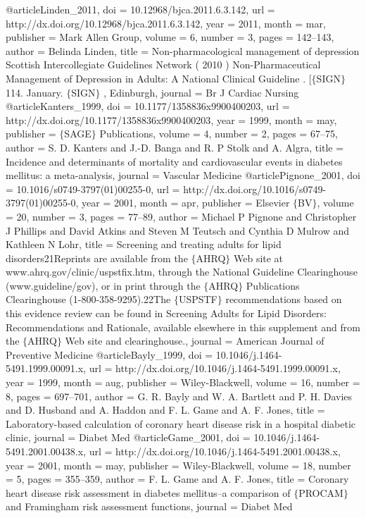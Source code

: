 @article{Linden_2011,
	doi = {10.12968/bjca.2011.6.3.142},
	url = {http://dx.doi.org/10.12968/bjca.2011.6.3.142},
	year = 2011,
	month = {mar},
	publisher = {Mark Allen Group},
	volume = {6},
	number = {3},
	pages = {142--143},
	author = {Belinda Linden},
	title = {Non-pharmacological management of depression Scottish Intercollegiate Guidelines Network ( 2010 ) Non-Pharmaceutical Management of Depression in Adults: A National Clinical Guideline . [$\lbrace$SIGN$\rbrace$ 114. January. $\lbrace$SIGN$\rbrace$ , Edinburgh},
	journal = {Br J Cardiac Nursing}
}
@article{Kanters_1999,
	doi = {10.1177/1358836x9900400203},
	url = {http://dx.doi.org/10.1177/1358836x9900400203},
	year = 1999,
	month = {may},
	publisher = {$\lbrace$SAGE$\rbrace$ Publications},
	volume = {4},
	number = {2},
	pages = {67--75},
	author = {S. D. Kanters and J.-D. Banga and R. P Stolk and A. Algra},
	title = {Incidence and determinants of mortality and cardiovascular events in diabetes mellitus: a meta-analysis},
	journal = {Vascular Medicine}
}
@article{Pignone_2001,
	doi = {10.1016/s0749-3797(01)00255-0},
	url = {http://dx.doi.org/10.1016/s0749-3797(01)00255-0},
	year = 2001,
	month = {apr},
	publisher = {Elsevier $\lbrace$BV$\rbrace$},
	volume = {20},
	number = {3},
	pages = {77--89},
	author = {Michael P Pignone and Christopher J Phillips and David Atkins and Steven M Teutsch and Cynthia D Mulrow and Kathleen N Lohr},
	title = {Screening and treating adults for lipid disorders21Reprints are available from the $\lbrace$AHRQ$\rbrace$ Web site at www.ahrq.gov/clinic/uspstfix.htm, through the National Guideline Clearinghouse (www.guideline/gov), or in print through the $\lbrace$AHRQ$\rbrace$ Publications Clearinghouse (1-800-358-9295).22The $\lbrace$USPSTF$\rbrace$ recommendations based on this evidence review can be found in Screening Adults for Lipid Disorders: Recommendations and Rationale, available elsewhere in this supplement and from the $\lbrace$AHRQ$\rbrace$ Web site and clearinghouse.},
	journal = {American Journal of Preventive Medicine}
}
@article{Bayly_1999,
	doi = {10.1046/j.1464-5491.1999.00091.x},
	url = {http://dx.doi.org/10.1046/j.1464-5491.1999.00091.x},
	year = 1999,
	month = {aug},
	publisher = {Wiley-Blackwell},
	volume = {16},
	number = {8},
	pages = {697--701},
	author = {G. R. Bayly and W. A. Bartlett and P. H. Davies and D. Husband and A. Haddon and F. L. Game and A. F. Jones},
	title = {Laboratory-based calculation of coronary heart disease risk in a hospital diabetic clinic},
	journal = {Diabet Med}
}
@article{Game_2001,
	doi = {10.1046/j.1464-5491.2001.00438.x},
	url = {http://dx.doi.org/10.1046/j.1464-5491.2001.00438.x},
	year = 2001,
	month = {may},
	publisher = {Wiley-Blackwell},
	volume = {18},
	number = {5},
	pages = {355--359},
	author = {F. L. Game and A. F. Jones},
	title = {Coronary heart disease risk assessment in diabetes mellitus--a comparison of $\lbrace$PROCAM$\rbrace$ and Framingham risk assessment functions},
	journal = {Diabet Med}
}
